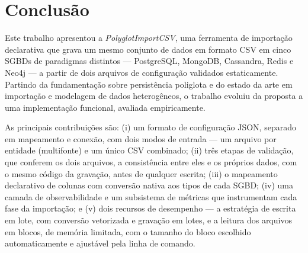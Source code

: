 \chapter{Conclusão}
\label{cap:conclusao}

Este trabalho apresentou a \textit{PolyglotImportCSV}, uma ferramenta de importação
declarativa que grava um mesmo conjunto de dados em formato CSV em cinco SGBDs de
paradigmas distintos --- PostgreSQL, MongoDB, Cassandra, Redis e Neo4j --- a partir de dois
arquivos de configuração validados estaticamente. Partindo da fundamentação sobre
persistência poliglota e do estado da arte em importação e modelagem de dados heterogêneos,
o trabalho evoluiu da proposta a uma implementação funcional, avaliada empiricamente.

As principais contribuições são: (i) um formato de configuração JSON, separado em mapeamento
e conexão, com dois modos de entrada --- um arquivo por entidade (multifonte) e um único CSV
combinado; (ii) três etapas de validação, que conferem os dois arquivos, a consistência entre
eles e os próprios dados, com o mesmo código da gravação, antes de qualquer escrita; (iii) o
mapeamento declarativo de colunas com conversão nativa aos tipos de cada SGBD; (iv) uma camada
de observabilidade e um subsistema de métricas que instrumentam cada fase da importação; e (v)
dois recursos de desempenho --- a estratégia de escrita em lote, com conversão vetorizada e
gravação em lotes, e a leitura dos arquivos em blocos, de memória limitada, com o tamanho do
bloco escolhido automaticamente e ajustável pela linha de comando.

